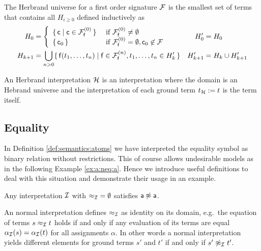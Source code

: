 \begin{definition}\label{def:hk}
	The {\myem Herbrand universe} for a first order signature ${\mathcal F}$ 
	is the smallest set of terms that contains all $H_{i\geq 0}$ defined inductively as
	\begin{align*}
	H_0 &= \left\{ 
	\begin{array}{ll}
	\{\,\mc \mid \mc\in\mcFfn[0]\,\} 
	&\text{if } \mcFfn[0]\not=\emptyset\\
	\{\,\mc_0\,\}
	&\text{if } \mcFfn[0]=\emptyset, \mc_0\not\in\mcF
	\end{array}
	\right. 
	&
	H'_0 &= H_0
	\\
	H_{k+1} &= \bigcup_{n> 0} 
	\{\,  
	\mf(t_1,\ldots,t_n) \mid
	\mf\in\mcFfn[n],
	t_1,\ldots,t_n \in H_k'
	\,\}
	&
	H'_{k+1} &= H_k \cup H'_{k+1}
	\end{align*}
	
\end{definition}

\begin{definition}
	An {\myem Herbrand interpretation} ${\mathcal H}$ is an interpretation where the domain 
	is an Hebrand universe
	and the interpretation of each ground term $t_{\mathcal H} := t$ is the term itself.
\end{definition}

\subsection{Equality}

In Definition \ref{def:semantics:atoms} we have interpreted the equality symbol as binary relation without restrictions.
This of course allows undesirable models as in the following Example \ref{ex:a:neq:a}.
Hence we introduce useful definitions to deal with this situation and demonstrate their usage in an example. 

\begin{example}
	\label{ex:a:neq:a}
	Any interpretation ${\mathcal I}$  
	with ${\approx_{\mathcal I}} = \emptyset$ satisfies ${\mathsf a}\not\approx{\mathsf a}$.
\end{example}

\begin{definition}\label{def:normal:interpreation}
	An {\myem normal} interpretation defines $\approx_{\mathcal I}$ as identity on its domain,
	e.g.~the equation of terms $s \approx_{\mathcal I} t$ holds if and only 
	if any evaluation of its terms are equal $\alpha_{\mathcal I}(s) = \alpha_{\mathcal I}(t)$ 
	for all assignments $\alpha$. 
	In other words a normal interpretation yields different elements 
	for ground terms $s'$ and $t'$ if and only if $s'\not\approx_{\mathcal I} t'$.
\end{definition}

